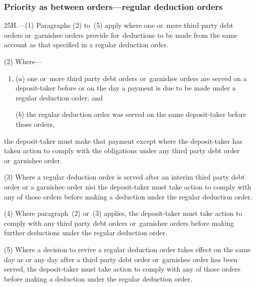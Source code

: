 \documentclass[12pt,a4paper]{article}
\begin{document}

\subsubsection[25H. Priority as between orders---regular deduction orders]{Priority as between orders---regular deduction orders}

25H.---(1)  Paragraphs (2) to~(5) apply where one or~more third party debt orders or~garnishee orders provide for~deductions to be made from the same account as that specified in a regular deduction order.

(2) Where—
\begin{enumerate}\item[]
($a$) one or~more third party debt orders or~garnishee orders are served on a deposit-taker before or on the day a payment is due to be made under a regular deduction order; and

($b$) the regular deduction order was served on the same deposit-taker before those orders,
\end{enumerate}
the deposit-taker must make that payment except where the deposit-taker has taken action to comply with the obligations under any third party debt order or~garnishee order.

(3) Where a regular deduction order is served after an interim third party debt order or a garnishee order nisi the deposit-taker must take action to comply with any of those orders before making a deduction under the regular deduction order.

(4) Where paragraph~(2) or~(3) applies, the deposit-taker must take action to comply with any third party debt orders or~garnishee orders before making further deductions under the regular deduction order.

(5) Where a decision to revive a regular deduction order takes effect on the same day as or any day after a third party debt order or~garnishee order has been served, the deposit-taker must take action to comply with any of those orders before making a deduction under the regular deduction order.
\end{document}
